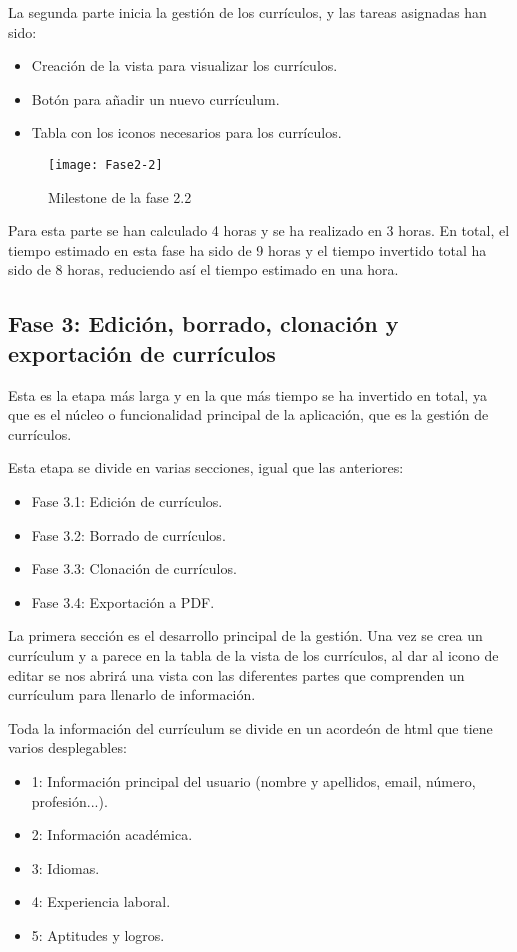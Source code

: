 La segunda parte inicia la gestión de los currículos, y las tareas asignadas han sido:
\begin{itemize}
\tightlist
\item Creación de la vista para visualizar los currículos.
\item Botón para añadir un nuevo currículum.
\item Tabla con los iconos necesarios para los currículos.
\end{itemize}

\begin{figure}
    \centering
    \texttt{[image: Fase2-2]}
    \caption{Milestone de la fase 2.2}
\end{figure}

Para esta parte se han calculado 4 horas y se ha realizado en 3 horas. En total, el tiempo
estimado en esta fase ha sido de 9 horas y el tiempo invertido total ha sido de 8 horas, reduciendo
así el tiempo estimado en una hora.

\subsection{Fase 3: Edición, borrado, clonación y exportación de currículos}
Esta es la etapa más larga y en la que más tiempo se ha invertido en total, ya que es el 
núcleo o funcionalidad principal de la aplicación, que es la gestión de currículos.

Esta etapa se divide en varias secciones, igual que las anteriores:
\begin{itemize}
\tightlist
\item Fase 3.1: Edición de currículos.
\item Fase 3.2: Borrado de currículos.
\item Fase 3.3: Clonación de currículos.
\item Fase 3.4: Exportación a PDF.
\end{itemize}

La primera sección es el desarrollo principal de la gestión. Una vez se crea un currículum
y a parece en la tabla de la vista de los currículos, al dar al icono de editar se nos
abrirá una vista con las diferentes partes que comprenden un currículum para llenarlo de 
información. 

Toda la información del currículum se divide en un acordeón de html que tiene varios desplegables:
\begin{itemize}
\tightlist
\item 1: Información principal del usuario (nombre y apellidos, email, número, profesión...).
\item 2: Información académica.
\item 3: Idiomas.
\item 4: Experiencia laboral.
\item 5: Aptitudes y logros.
\end{itemize}

